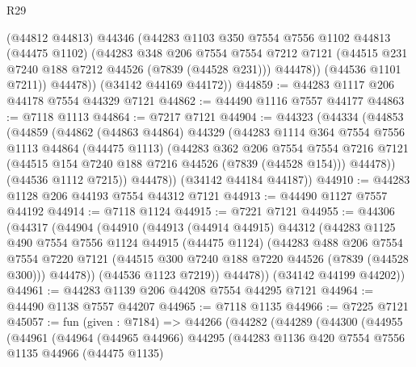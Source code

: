 \begin{lexlean}{R29}
\begin{coremodule}
            (@44812 @44813)
            @44346
            (@44283
              @1103
              @350
              @7554
              @7556
              @1102
              @44813
              (@44475 @1102)
              (@44283
                @348
                @206
                @7554
                @7554
                @7212
                @7121
                (@44515 @231 @7240 @188 @7212 @44526 (@7839 (@44528 @231)))
                @44478))
            (@44536 @1101 @7211))
          @44478))
      (@34142 @44169 @44172))
@44859 := @44283 @1117 @206 @44178 @7554 @44329 @7121
@44862 := @44490 @1116 @7557 @44177
@44863 := @7118 @1113
@44864 := @7217 @7121
@44904 := @44323
    (@44334
      (@44853
        (@44859
          (@44862
            (@44863 @44864)
            @44329
            (@44283
              @1114
              @364
              @7554
              @7556
              @1113
              @44864
              (@44475 @1113)
              (@44283
                @362
                @206
                @7554
                @7554
                @7216
                @7121
                (@44515 @154 @7240 @188 @7216 @44526 (@7839 (@44528 @154)))
                @44478))
            (@44536 @1112 @7215))
          @44478))
      (@34142 @44184 @44187))
@44910 := @44283 @1128 @206 @44193 @7554 @44312 @7121
@44913 := @44490 @1127 @7557 @44192
@44914 := @7118 @1124
@44915 := @7221 @7121
@44955 := @44306
    (@44317
      (@44904
        (@44910
          (@44913
            (@44914 @44915)
            @44312
            (@44283
              @1125
              @490
              @7554
              @7556
              @1124
              @44915
              (@44475 @1124)
              (@44283
                @488
                @206
                @7554
                @7554
                @7220
                @7121
                (@44515 @300 @7240 @188 @7220 @44526 (@7839 (@44528 @300)))
                @44478))
            (@44536 @1123 @7219))
          @44478))
      (@34142 @44199 @44202))
@44961 := @44283 @1139 @206 @44208 @7554 @44295 @7121
@44964 := @44490 @1138 @7557 @44207
@44965 := @7118 @1135
@44966 := @7225 @7121
@45057 := fun (given : @7184) =>
  @44266
    (@44282
      (@44289
        (@44300
          (@44955
            (@44961
              (@44964
                (@44965 @44966)
                @44295
                (@44283
                  @1136
                  @420
                  @7554
                  @7556
                  @1135
                  @44966
                  (@44475 @1135)

\end{coremodule}
\end{lexlean}
